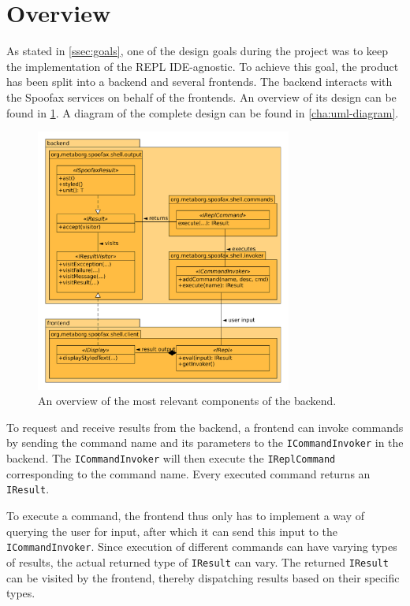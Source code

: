 \section{Overview}
\label{sec:overview}

As stated in \cref{ssec:goals}, one of the design goals during the project was
to keep the implementation of the REPL IDE-agnostic. To achieve this goal, the
product has been split into a backend and several frontends. The backend
interacts with the Spoofax services on behalf of the frontends. An overview of
its design can be found in \cref{fig:uml-overview}. A diagram of the complete
design can be found in \cref{cha:uml-diagram}.

\begin{figure}[h!]
  \centering
  \includegraphics[width=0.75\textwidth]{uml-overview}
  \caption{An overview of the most relevant components of the backend.}
  \label{fig:uml-overview}
\end{figure}

To request and receive results from the backend, a frontend can invoke commands
by sending the command name and its parameters to the \texttt{ICommandInvoker}
in the backend. The \texttt{ICommandInvoker} will then execute the
\texttt{IReplCommand} corresponding to the command name. Every executed command
returns an \texttt{IResult}.

To execute a command, the frontend thus only has to implement a way of querying
the user for input, after which it can send this input to the
\texttt{ICommandInvoker}. Since execution of different commands can have
varying types of results, the actual returned type of \texttt{IResult} can
vary. The returned \texttt{IResult} can be visited by the frontend, thereby
dispatching results based on their specific types.


